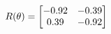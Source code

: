 \documentclass[preview]{standalone}
\begin{document}
\begin{align*}
\special{dvisvgm:raw <g id='unique000'>}R(\theta) = \begin{bmatrix}-0.92 & -0.39\\0.39 & -0.92\end{bmatrix}\special{dvisvgm:raw </g>}
\end{align*}
\end{document}
